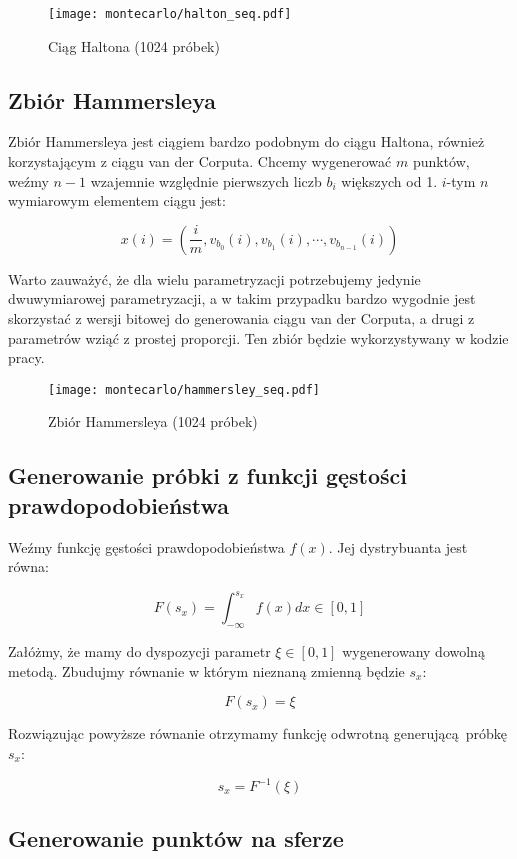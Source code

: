 \documentclass[../main.tex]{subfiles}
\begin{document}
\begin{figure}[h]
  \centering
  \texttt{[image: montecarlo/halton\_seq.pdf]}
  \caption{Ciąg Haltona (1024 próbek)}
  \label{fig:HaltonSamples}
\end{figure}

\subsection{Zbiór Hammersleya}

Zbiór Hammersleya jest ciągiem bardzo podobnym do ciągu Haltona, również
korzystającym z ciągu van der Corputa. Chcemy wygenerować $m$ punktów, weźmy
$n-1$ wzajemnie względnie pierwszych liczb $b_i$ większych od 1. $i$-tym $n$
wymiarowym elementem ciągu jest:

\[
  x(i) = \left(
    \frac{i}{m}, v_{b_0}(i), v_{b_1}(i), \cdots, v_{b_{n-1}}(i)
  \right)
\]

Warto zauważyć, że dla wielu parametryzacji potrzebujemy jedynie dwuwymiarowej
parametryzacji, a w takim przypadku bardzo wygodnie jest skorzystać z wersji
bitowej do generowania ciągu van der Corputa, a drugi z parametrów wziąć z
prostej proporcji. Ten zbiór będzie wykorzystywany w kodzie pracy.

\begin{figure}[h]
  \centering
  \texttt{[image: montecarlo/hammersley\_seq.pdf]}
  \caption{Zbiór Hammersleya (1024 próbek)}
  \label{fig:HammersleySamples}
\end{figure}

\subsection{Generowanie próbki z funkcji gęstości prawdopodobieństwa}

Weźmy funkcję gęstości prawdopodobieństwa $f(x)$. Jej dystrybuanta jest równa:

\[ F(s_x) = \int_{-\infty}^{s_{x}} f(x) dx \in [0,1] \]

Załóżmy, że mamy do dyspozycji parametr $\xi \in [0,1]$ wygenerowany dowolną
metodą. Zbudujmy równanie w którym nieznaną zmienną będzie $s_x$:

\[ F(s_x) = \xi \]

Rozwiązując powyższe równanie otrzymamy funkcję odwrotną generującą próbkę
$s_x$:

\[ s_x = F^{-1}(\xi) \]

\subsection{Generowanie punktów na sferze}
\end{document}
